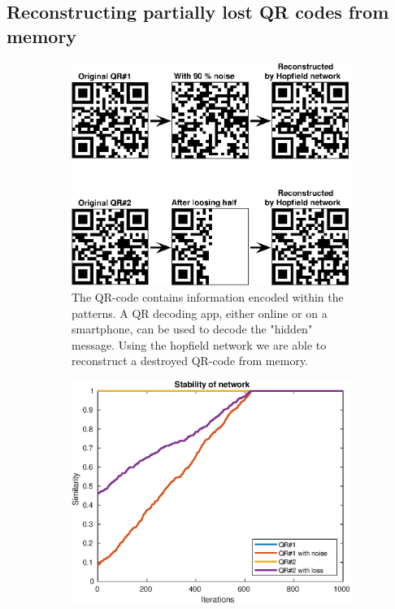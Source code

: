 \subsection{Reconstructing partially lost QR codes from memory}
\begin{figure}[H]
    \centering
    \begin{subfigure}{0.49\textwidth}
        \includegraphics[width=\textwidth]{figs/qr-code}
        \caption{The QR-code contains information encoded within the patterns. A QR decoding app, either online or on a smartphone, can be used to decode the "hidden" message. Using the hopfield network we are able to reconstruct a destroyed QR-code from memory.}
    \end{subfigure}
    \begin{subfigure}{0.49\textwidth}
        \includegraphics[width=\textwidth]{figs/qr-code-sim}

\end{subfigure}
\end{figure}
